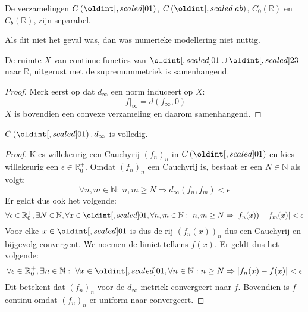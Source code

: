\documentclass[main.tex]{subfiles}
\begin{document}
\begin{vb}
  De verzamelingen $C\left(\interval{0}{1}\right)$, $C\left(\interval{a}{b}\right)$, $C_{0}\left(\mathbb{R}\right)$ en $C_{b}\left(\mathbb{R}\right)$, zijn separabel.
\end{vb}

\begin{opm}
  Als dit niet het geval was, dan was numerieke modellering niet nuttig.
\end{opm}

\begin{vb}
  De ruimte $X$ van continue functies van $\interval{0}{1} \cup \interval{2}{3}$ naar $\mathbb{R}$, uitgerust met de supremummetriek is samenhangend.

  \begin{proof}
    Merk eerst op dat $d_{\infty}$ een norm induceert op $X$:
    \[ |f|_{\infty} = d(f_{\infty},0) \]
    $X$ is bovendien een convexe verzameling en daarom samenhangend.
  \end{proof}
\end{vb}

\begin{vb}
  \label{vb:continue-functies-volledig}
  $C\left(\interval{0}{1}\right), d_{\infty}$ is volledig.

  \begin{proof}
    Kies willekeurig een Cauchyrij $(f_{n})_{n}$ in $C\left(\interval{0}{1}\right)$ en kies willekeurig een $\epsilon\in\mathbb{R}_{0}^{+}$.
    Omdat $(f_{n})_{n}$ een Cauchyrij is, bestaat er een $N\in\mathbb{N}$ als volgt:
    $$ \forall n,m\in\mathbb{N}:\ n,m\ge N \Rightarrow d_{\infty}(f_{n},f_{m}) < \epsilon $$
    Er geldt dus ook het volgende:
    $$ \forall \epsilon \in\mathbb{R}_{0}^{+}, \exists N \in \mathbb{N}, \forall x\in\interval{0}{1}, \forall n,m\in\mathbb{N}:\ n,m\ge N \Rightarrow |f_{n}(x)) - f_{m}(x)| < \epsilon $$
    Voor elke $x\in\interval{0}{1}$ is dus de rij $(f_{n}(x))_{n}$ dus een Cauchyrij en bijgevolg convergent.
    We noemen de limiet telkens $f(x)$.
    Er geldt dus het volgende:
    \[ \forall \epsilon \in\mathbb{R}_{0}^{+}, \exists n\in\mathbb{N}:\ \forall x\in\interval{0}{1}, \forall n\in\mathbb{N}: n\ge N \Rightarrow |f_{n}(x)-f(x)| < \epsilon \]
    Dit betekent dat $(f_{n})_{n}$ voor de $d_{\infty}$-metriek convergeert naar $f$.
    Bovendien is $f$ continu omdat $(f_{n})_{n}$ er uniform naar convergeert.
  \end{proof}
\end{vb}
\end{document}
